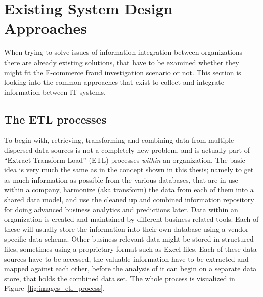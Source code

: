
\section{Existing System Design Approaches}
\label{sec:system_approaches}

When trying to solve issues of information integration between organizations there are already existing solutions, that have to be examined whether they might fit the \gls{E-commerce} fraud investigation scenario or not. This section is looking into the common approaches that exist to collect and integrate information between \gls{IT} systems.

\subsection{The \gls{ETL} processes}
\label{subsec:etl_process}

To begin with, retrieving, transforming and combining data from multiple dispersed data sources is not a completely new problem, and is actually part of ``Extract-Transform-Load'' (\gls{ETL}) processes \emph{within} an organization. The basic idea is very much the same as in the concept shown in this thesis; namely to get as much information as possible from the various databases, that are in use within a company, harmonize (aka transform) the data from each of them into a shared data model, and use the cleaned up and combined information repository for doing advanced business analytics and predictions later. Data within an organization is created and maintained by different business-related tools. Each of these will usually store the information into their own database using a vendor-specific data schema. Other business-relevant data might be stored in structured files, sometimes using a proprietary format such as Excel files. Each of these data sources have to be accessed, the valuable information have to be extracted and mapped against each other, before the analysis of it can begin on a separate data store, that holds the combined data set. The whole process is visualized in Figure~\ref{fig:images_etl_process}. \\

